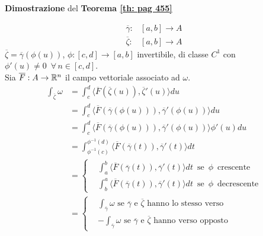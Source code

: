 \begin{dembar}
	\textbf{Dimostrazione} del \textbf{Teorema \ref{th: pag 455}}
	
	\begin{align*}
		\overline{\gamma}:& [a,b]\rightarrow A\\
		\overline{\zeta}:&[a,b]\rightarrow A
	\end{align*}
	$\overline{\zeta}=\overline{\gamma}(\phi(u))$, $\phi:[c,d]\rightarrow[a,b]$
	invertibile, di classe $C^1$ con $\phi'(u)\neq 0 \,\,\, \forall \, n \in [c,d]$.\\
	Sia $\overline{F} : A \rightarrow \mathbb{R}^n$ il campo vettoriale associato ad $\omega$.
	\begin{align*}
		\int_{\overline{\zeta}} \omega& = \int_c^d \langle  \overline{F}(\overline{\zeta}(u)),\overline{\zeta}'(u) \rangle du \\
		& =\int_c^d \langle \overline{F}(\overline{\gamma}(\phi(u))), \overline{\gamma}' (\phi(u)) \rangle du\\
		&= \int_c^d \langle \overline{F}(\overline{\gamma}(\phi(u))),\overline{\gamma}'(\phi(u))\rangle \phi' (u)du\\
		&=\int_{\phi^{-1}(c)}^{\phi^{-1}(d)}\langle \overline{F}(\overline{\gamma}(t)), \overline{\gamma}'(t)\rangle dt\\
		&=\begin{cases}
			& \int_a^b \langle \overline{F}(\overline{\gamma}(t)), \overline{\gamma}'(t) \rangle dt\,\,\, \text{se}\,\,\, \phi \,\,\, \text{crescente}  \\
			& \int_b^a \langle \overline{F}(\overline{\gamma}(t)), \overline{\gamma}'(t) \rangle dt\,\,\, \text{se}\,\,\, \phi \,\,\, \text{decrescente}
		\end{cases}\\
		&=\begin{cases}
			&\int_{\overline{\gamma}}\omega \text{  se  } \overline{\gamma} \text{  e  }\overline{\zeta} \text{  hanno lo stesso verso}\\
			&-\int_{\overline{\gamma}}\omega \text{  se  } \overline{\gamma} \text{  e  } \overline{\zeta} \text{  hanno verso opposto}
		\end{cases}
	\end{align*}
\end{dembar}

